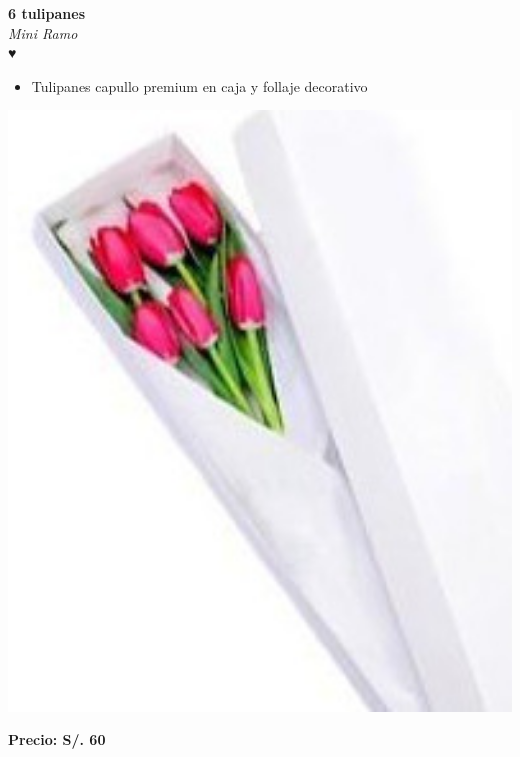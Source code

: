 \documentclass[12pt]{article}
\begin{document}
\vspace{1cm}
\noindent
\begin{minipage}{0.6\textwidth}
    \textcolor[HTML]{FF8C00}{\textbf{\huge 6 tulipanes }}\\
    {\textit{Mini Ramo}} \\
    \textcolor[HTML]{FF8C00}{\Huge ♥} \\
    \vspace{0.5cm}
    \begin{itemize}
        \item Tulipanes capullo premium en caja y follaje decorativo
    \end{itemize}
\end{minipage}
\hspace{1cm}
\begin{minipage}{0.35\textwidth}
    \includegraphics[width=1.0\textwidth]{imagenes_extraidas/image_2_5}
\end{minipage}
\vspace{0.3cm}
\begin{center}
   \textbf{\Large Precio: \textcolor[HTML]{228B22}{S/. 60 }}
\end{center}
\end{document}
